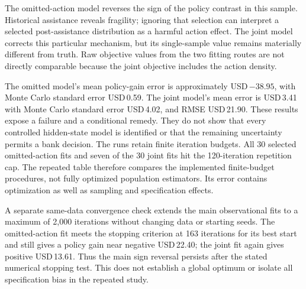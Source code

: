 \begin{table}[htbp]\centering\small

\caption{Unknown-emission estimation. The policy contrast is assistance
after the most severe current signal versus no assistance, over eight
decisions. The true gain is USD\,22.34.}
\label{tab:hmm-estimation}
\end{table}

The omitted-action model reverses the sign of the policy contrast in this
sample. Historical assistance reveals fragility; ignoring that selection
can interpret a selected post-assistance distribution as a harmful action
effect. The joint model corrects this particular mechanism, but its
single-sample value remains materially different from truth. Raw objective
values from the two fitting routes are not directly comparable because
the joint objective includes the action density.

\begin{table}[htbp]\centering\small

\caption{Thirty independently generated observational datasets of 500
trajectories, with both fitting routes applied to each dataset. Correct
logging specification improves parameter recovery but leaves substantial
policy-value variability.}
\label{tab:hmm-repeated}
\end{table}

The omitted model's mean policy-gain error is approximately
USD\,$-38.95$, with Monte Carlo standard error USD\,0.59. The joint
model's mean error is USD\,3.41 with Monte Carlo standard error USD\,4.02,
and RMSE USD\,21.90. These results expose a failure and a conditional
remedy. They do not show that every controlled hidden-state model is
identified or that the remaining uncertainty permits a bank decision.
The runs retain finite iteration budgets. All 30 selected omitted-action
fits and seven of the 30 joint fits hit the 120-iteration repetition cap.
The repeated table therefore compares the implemented finite-budget
procedures, not fully optimized population estimators. Its error contains
optimization as well as sampling and specification effects.

A separate same-data convergence check extends the main observational
fits to a maximum of 2,000 iterations without changing data or starting
seeds. The omitted-action fit meets the stopping criterion at 163 iterations
for its best start and still gives a policy gain near negative USD\,22.40;
the joint fit again gives positive USD\,13.61. Thus the main sign reversal
persists after the stated numerical stopping test. This does not establish
a global optimum or isolate all specification bias in the repeated study.

